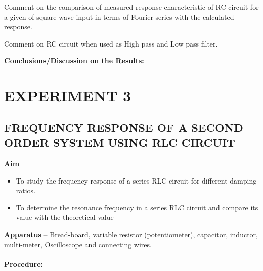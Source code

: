 \documentclass[9pt]{scrreprt}
\begin{document}
\noindent Comment on the comparison of measured response characteristic of RC circuit for a given of square wave input in terms of Fourier series with the calculated response.

\noindent Comment on RC circuit when used as High pass and Low pass filter.

\noindent \textbf{Conclusions/Discussion on the Results:}

\chapter*{\Large EXPERIMENT 3}
\setcounter{chapter}{3}
\setcounter{table}{0}
\section*{\normalsize FREQUENCY RESPONSE OF A SECOND ORDER SYSTEM USING RLC CIRCUIT}
\textbf{Aim}

\begin{itemize}
\item To study the frequency response of a series RLC circuit for different damping ratios.
\item To determine the resonance frequency in a series RLC circuit and compare its value with the theoretical value
\end{itemize} 
\textbf{Apparatus} – Bread-board, variable resistor (potentiometer), capacitor, inductor, multi-meter, Oscilloscope and connecting wires.\\
\\
\textbf{Procedure:}
\end{document}
